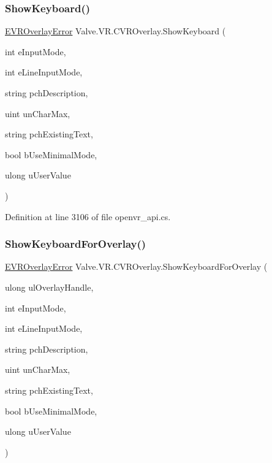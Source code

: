 \subsubsection{\texorpdfstring{ShowKeyboard()}{ShowKeyboard()}}
{\footnotesize\ttfamily \mbox{\hyperlink{namespace_valve_1_1_v_r_aaee5c5144f42b7969d45b854f51b0c18}{E\+V\+R\+Overlay\+Error}} Valve.\+V\+R.\+C\+V\+R\+Overlay.\+Show\+Keyboard (\begin{DoxyParamCaption}\item[{int}]{e\+Input\+Mode,  }\item[{int}]{e\+Line\+Input\+Mode,  }\item[{string}]{pch\+Description,  }\item[{uint}]{un\+Char\+Max,  }\item[{string}]{pch\+Existing\+Text,  }\item[{bool}]{b\+Use\+Minimal\+Mode,  }\item[{ulong}]{u\+User\+Value }\end{DoxyParamCaption})}



Definition at line 3106 of file openvr\+\_\+api.\+cs.

\mbox{\label{class_valve_1_1_v_r_1_1_c_v_r_overlay_ac60a45b04d035b5abff6a25e3e3f9ed6}} 
\subsubsection{\texorpdfstring{ShowKeyboardForOverlay()}{ShowKeyboardForOverlay()}}
{\footnotesize\ttfamily \mbox{\hyperlink{namespace_valve_1_1_v_r_aaee5c5144f42b7969d45b854f51b0c18}{E\+V\+R\+Overlay\+Error}} Valve.\+V\+R.\+C\+V\+R\+Overlay.\+Show\+Keyboard\+For\+Overlay (\begin{DoxyParamCaption}\item[{ulong}]{ul\+Overlay\+Handle,  }\item[{int}]{e\+Input\+Mode,  }\item[{int}]{e\+Line\+Input\+Mode,  }\item[{string}]{pch\+Description,  }\item[{uint}]{un\+Char\+Max,  }\item[{string}]{pch\+Existing\+Text,  }\item[{bool}]{b\+Use\+Minimal\+Mode,  }\item[{ulong}]{u\+User\+Value }\end{DoxyParamCaption})}



